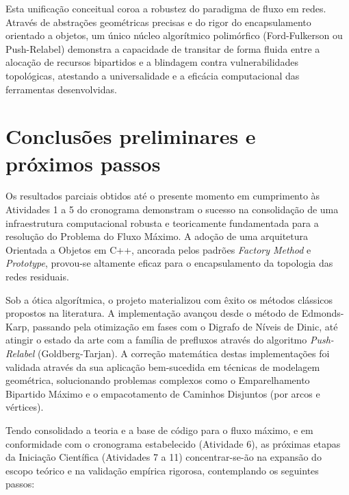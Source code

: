 \documentclass[12pt,a4paper]{article}
\begin{document}
Esta unificação conceitual coroa a robustez do paradigma de fluxo em redes. Através de abstrações geométricas precisas e do rigor do encapsulamento orientado a objetos, um único núcleo algorítmico polimórfico (Ford-Fulkerson ou Push-Relabel) demonstra a capacidade de transitar de forma fluida entre a alocação de recursos bipartidos e a blindagem contra vulnerabilidades topológicas, atestando a universalidade e a eficácia computacional das ferramentas desenvolvidas.

\section{Conclusões preliminares e próximos passos}

Os resultados parciais obtidos até o presente momento em cumprimento às Atividades 1 a 5 do cronograma demonstram o sucesso na consolidação de uma infraestrutura computacional robusta e teoricamente fundamentada para a resolução do Problema do Fluxo Máximo. A adoção de uma arquitetura Orientada a Objetos em C++, ancorada pelos padrões \textit{Factory Method} e \textit{Prototype}, provou-se altamente eficaz para o encapsulamento da topologia das redes residuais.

Sob a ótica algorítmica, o projeto materializou com êxito os métodos clássicos propostos na literatura. A implementação avançou desde o método de Edmonds-Karp, passando pela otimização em fases com o Digrafo de Níveis de Dinic, até atingir o estado da arte com a família de prefluxos através do algoritmo \textit{Push-Relabel} (Goldberg-Tarjan). A correção matemática destas implementações foi validada através da sua aplicação bem-sucedida em técnicas de modelagem geométrica, solucionando problemas complexos como o Emparelhamento Bipartido Máximo e o empacotamento de Caminhos Disjuntos (por arcos e vértices).

Tendo consolidado a teoria e a base de código para o fluxo máximo, e em conformidade com o cronograma estabelecido (Atividade 6), as próximas etapas da Iniciação Científica (Atividades 7 a 11) concentrar-se-ão na expansão do escopo teórico e na validação empírica rigorosa, contemplando os seguintes passos:
\end{document}
